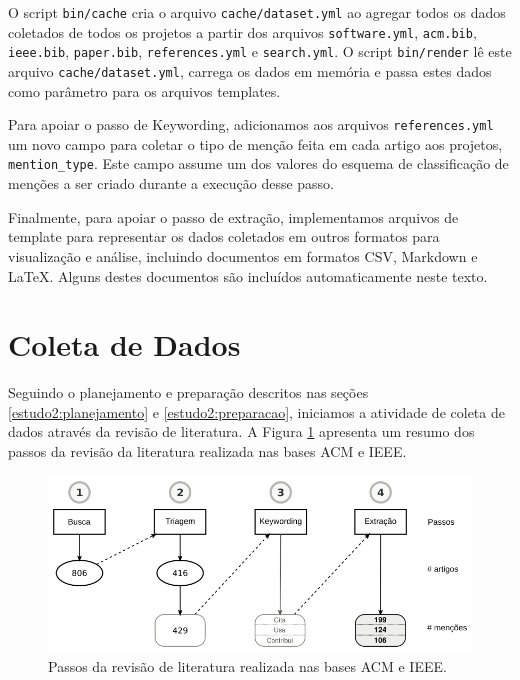 O script \texttt{bin/cache} cria o arquivo \texttt{cache/dataset.yml} ao
agregar todos os dados coletados de todos os projetos a partir dos arquivos
\texttt{software.yml}, \texttt{acm.bib}, \texttt{ieee.bib}, \texttt{paper.bib},
\texttt{references.yml} e \texttt{search.yml}.
O script \texttt{bin/render} lê este arquivo \texttt{cache/dataset.yml},
carrega os dados em memória e passa estes dados como parâmetro para os arquivos
templates.


Para apoiar o passo de Keywording, 
adicionamos aos arquivos \texttt{references.yml} um novo campo para coletar o
tipo de menção feita em cada artigo aos projetos, \texttt{mention\_type}. 
Este campo assume um dos valores do esquema de classificação de menções 
a ser criado durante a execução desse passo.


Finalmente, para apoiar o passo de extração, 
implementamos arquivos de template para representar os dados coletados em
outros formatos para visualização e análise, incluindo documentos em formatos
CSV, Markdown e \LaTeX. Alguns destes documentos são incluídos automaticamente
neste texto.


\section{Coleta de Dados} \label{estudo2:coleta} %

Seguindo o planejamento e preparação descritos nas seções
\ref{estudo2:planejamento} e \ref{estudo2:preparacao}, iniciamos a atividade de coleta de
dados através da revisão de literatura.
A Figura \ref{estudo2-revisao-literatura} apresenta um resumo dos passos da revisão da literatura
realizada nas bases ACM e IEEE.

\begin{figure}[h]
  \center
  \includegraphics[scale=0.35]{imagens/estudo2-revisao-literatura.png}
  \caption{Passos da revisão de literatura realizada nas bases ACM e IEEE.}
  \label{estudo2-revisao-literatura}
\end{figure}


